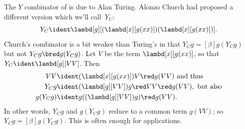 \documentclass[../../../include/open-logic-section]{subfiles}
\begin{document}
The $Y$ combinator of  is due to Alan
Turing. Alonzo Church had proposed a different version which we'll
call~$Y_C$:
\[
Y_C \ident \lambd[g][(\lambd[x][g(xx)])(\lambd[x][g(xx)])].
\]
Church's combinator is a bit weaker than Turing's in that $Y_C g
\equal[\beta] g(Y_C g)$ but not $Y_C g \bred g(Y_C g)$. Let $V$ be the term
$\lambd[x][g(xx)]$, so that $Y_C \ident \lambd[g][VV]$. Then
\begin{align*}
  VV & \ident (\lambd[x][g(xx)])V \red g(VV)
  \text{ and thus}\\
  Y_C g & \ident (\lambd[g][VV])g \red VV \red g(VV), \text{ but also}\\
  g(Y_C g) & \ident g((\lambd[g][VV])g) \red g(VV).
\end{align*}
In other words, $Y_C g$ and $g(Y_C g)$ reduce to a common term
$g(VV)$; so $Y_C g \equal[\beta] g(Y_C g)$. This is often enough for
applications.
\end{document}
